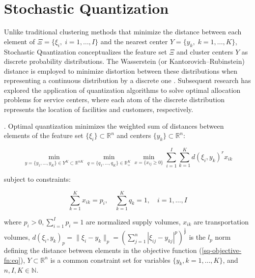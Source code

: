 \section{Stochastic Quantization}

Unlike traditional clustering methods that minimize the distance between each element of $\Xi = \{\xi_i, \;i = 1, \ldots, I\}$ and the nearest center $Y = \{y_k, \;k = 1, \ldots, K\}$, Stochastic Quantization conceptualizes the feature set $\Xi$ and cluster centers $Y$ as discrete probability distributions. The Wasserstein (or Kantorovich–Rubinstein) distance is employed to minimize distortion between these distributions when representing a continuous distribution by a discrete one \cite{Kuzmenko_Uryasev_2019,Lakshmanan_Pichler_2023}. Subsequent research \cite{Kuzmenko_Uryasev_2019,Norkin_Onishchenko_2005} has explored the application of quantization algorithms to solve optimal allocation problems for service centers, where each atom of the discrete distribution represents the location of facilities and customers, respectively.

\begin{definition}
    \label{Stochastic Quantization} \cite{Kuzmenko_Uryasev_2019}. Optimal quantization minimizes the weighted sum of distances between elements of the feature set $\{\xi_i\} \subset \mathbb{R}^{n}$ and centers $\{y_k\} \subset \mathbb{R}^{n}$:

    \begin{equation}
        \label{sq-objective-fn:eq}
            \min_{y = \{ y_1, \ldots, y_K \} \in Y^K \subset \mathbb{R}^{nK}} \min_{q = \{ q_1, \ldots, q_K \} \in \mathbb{R}^K_{+}} \min_{x = \{ x_{ij} \geq 0 \}} \sum_{i=1}^I \sum_{k=1}^K d(\xi_i, y_k)^r x_{ik}
    \end{equation}

    subject to constraints:

    \begin{equation}
        \label{sq-objective-constraints:eq}
            \sum_{k=1}^K x_{ik} = p_i, \quad \sum_{k=1}^K q_k = 1, \quad i = 1, \ldots, I
    \end{equation}

    \noindent where $p_i > 0, \sum_{i=1}^I p_i = 1$ are normalized supply volumes, $x_{ik}$ are transportation volumes, $ d(\xi_i, y_k)_p = \| \xi_i - y_k \|_p = (\sum_{j=1}^n | \xi_{ij} - y_{kj} |^p)^{\frac{1}{p}} $ is the $l_p$ norm defining the distance between elements in the objective function (\ref{sq-objective-fn:eq}), $Y \subset \mathbb{R}^{n}$ is a common constraint set for variables $\{y_k, k = 1, \ldots, K\}$, and $n, I, K \in \mathbb{N}$.
\end{definition}


